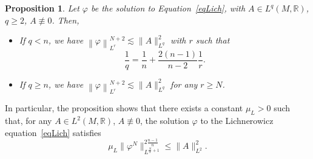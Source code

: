 \documentclass[a4paper, 10pt, reqno]{amsart}
\theoremstyle{plain}
\newtheorem{proposition}[thm]{Proposition}
\theoremstyle{remark}
\theoremstyle{definition}
\renewcommand{\phi}{\varphi}
\newcommand{\bR}{\mathbb{R}}
\begin{document}
\begin{proposition}\label{propEstimateLichUpper}
    Let $\phi$ be the solution to Equation~\eqref{eqLich}, with $A \in L^q(M,
        \bR)$, $q \geq 2$, $A \not\equiv 0$. Then,

    \begin{itemize}
        \item If $q < n$, we have $\left\|\phi\right\|_{L^r}^{N+2} \lesssim \|A\|_{L^q}^2$
              with $r$ such that
              \[
                  \frac{1}{q} = \frac{1}{n} + \frac{2(n-1)}{n-2} \frac{1}{r}.
              \]
        \item If $q \geq n$, we have $\left\|\phi\right\|_{L^r}^{N+2} \lesssim \|A\|_{L^q}^2$
              for any $r \geq N$.
    \end{itemize}
\end{proposition}

In particular, the proposition shows that there exists a constant $\mu_L > 0$
such that, for any $A \in L^2(M, \bR)$, $A \not\equiv 0$, the solution $\phi$
to the Lichnerowicz equation~\eqref{eqLich} satisfies
\begin{equation}\label{eqDefMuL}
    \mu_L \|\phi^N\|_{L^{\frac{N}{2}+1}}^{2\frac{n-1}{n}} \leq \|A\|_{L^2}^2.
\end{equation}
\end{document}
